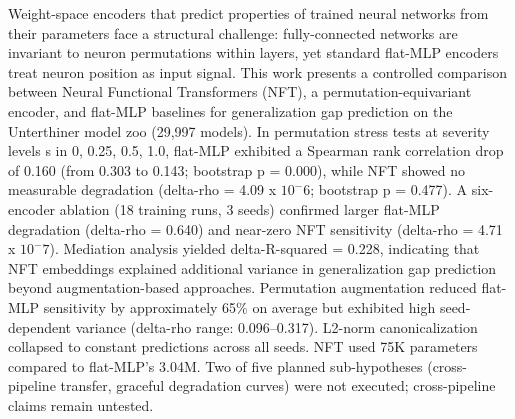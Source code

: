 
Weight-space encoders that predict properties of trained neural networks from their parameters face a structural challenge: fully-connected networks are invariant to neuron permutations within layers, yet standard flat-MLP encoders treat neuron position as input signal. This work presents a controlled comparison between Neural Functional Transformers (NFT), a permutation-equivariant encoder, and flat-MLP baselines for generalization gap prediction on the Unterthiner model zoo (29,997 models). In permutation stress tests at severity levels s in {0, 0.25, 0.5, 1.0}, flat-MLP exhibited a Spearman rank correlation drop of 0.160 (from 0.303 to 0.143; bootstrap p = 0.000), while NFT showed no measurable degradation (delta-rho = 4.09 x $10^-6$; bootstrap p = 0.477). A six-encoder ablation (18 training runs, 3 seeds) confirmed larger flat-MLP degradation (delta-rho = 0.640) and near-zero NFT sensitivity (delta-rho = 4.71 x $10^-7$). Mediation analysis yielded delta-R-squared = 0.228, indicating that NFT embeddings explained additional variance in generalization gap prediction beyond augmentation-based approaches. Permutation augmentation reduced flat-MLP sensitivity by approximately 65\% on average but exhibited high seed-dependent variance (delta-rho range: 0.096--0.317). L2-norm canonicalization collapsed to constant predictions across all seeds. NFT used 75K parameters compared to flat-MLP's 3.04M. Two of five planned sub-hypotheses (cross-pipeline transfer, graceful degradation curves) were not executed; cross-pipeline claims remain untested.
